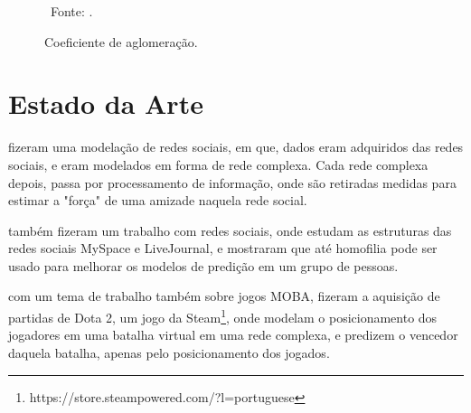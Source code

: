 \begin{figure}[!h] \centering
	\centering
	\caption{Coeficiente de aglomeração.}
	\
	\small{Fonte: \cite{d3js}.}
	\label{fig:d3}
\end{figure}


\section{Estado da Arte}


\citet{fbclass} fizeram uma modelação de redes sociais, em que, dados eram adquiridos das redes sociais, e eram modelados em forma de rede complexa. Cada rede complexa depois, passa por processamento de informação, onde são retiradas medidas para estimar a "força" de uma amizade naquela rede social.

\citet{backstrom2006group} também fizeram um trabalho com redes sociais, onde estudam as estruturas das redes sociais MySpace e LiveJournal, e mostraram que até homofilia pode ser usado para melhorar os modelos de predição em um grupo de pessoas.

\citet{dota} com um tema de trabalho também sobre jogos MOBA, fizeram a aquisição de partidas de Dota 2, um jogo da Steam\footnote{https://store.steampowered.com/?l=portuguese}, onde modelam o posicionamento dos jogadores em uma batalha virtual em uma rede complexa, e predizem o vencedor daquela batalha, apenas pelo posicionamento dos jogados.